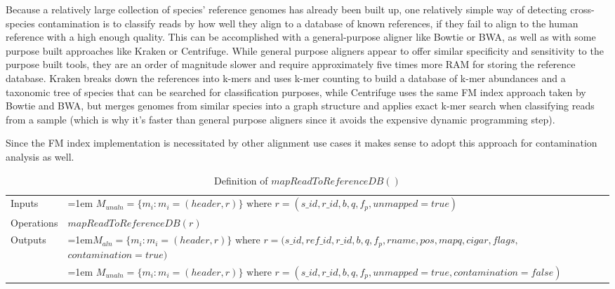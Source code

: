 Because a relatively large collection of species' reference genomes has already been built up, one relatively simple way of detecting cross-species contamination is to classify reads by how well they align to a database of known references, if they fail to align to the human reference with a high enough quality. This can be accomplished with a general-purpose aligner like Bowtie or BWA, as well as with some purpose built approaches like Kraken\autocite{wood2014kraken} or Centrifuge\autocite{kim2016centrifuge}. While general purpose aligners appear to offer similar specificity and sensitivity to the purpose built tools, they are an order of magnitude slower and require approximately five times more RAM for storing the reference database\autocite{kim2016centrifuge}. Kraken breaks down the references into k-mers and uses k-mer counting to build a database of k-mer abundances and a taxonomic tree of species that can be searched for classification purposes, while Centrifuge uses the same FM index approach taken by Bowtie and BWA, but merges genomes from similar species into a graph structure and applies exact k-mer search when classifying reads from a sample (which is why it's faster than general purpose aligners since it avoids the expensive dynamic programming step).

Since the FM index implementation is necessitated by other alignment use cases it makes sense to adopt this approach for contamination analysis as well. 

\bgroup
\def\arraystretch{1.5}
\begin{table}[!ht]
    \caption{Definition of $mapReadToReferenceDB()$}
    \label{tab:op_map_pair_to_reference_db}
    {\begin{tabular}{l|p{12cm}}
    \toprule
    Inputs & \hangindent=1em $M_{unaln} = \{m_i: m_i = (header, r)\} \text{  where } r = (s\_id, r\_id, b, q, f_p, unmapped=true)$\\
    \cline{2-2}
    Operations & $mapReadToReferenceDB(r)$\\
    \cline{2-2}
    \multirow{2}{*}{Outputs} & \hangindent=1em$M_{aln} = \{m_i: m_i = (header, r)\} \text{ where } r = (s\_id, ref\_id, r\_id, b, q, f_p, rname, pos, mapq, cigar, flags,$ $contamination=true)$\\
    & \hangindent=1em $M_{unaln} = \{m_i: m_i = (header, r)\} \text{  where } r = (s\_id, r\_id, b, q, f_p, unmapped=true, contamination=false)$\\
    \bottomrule
    \end{tabular}}
\end{table}
\egroup

